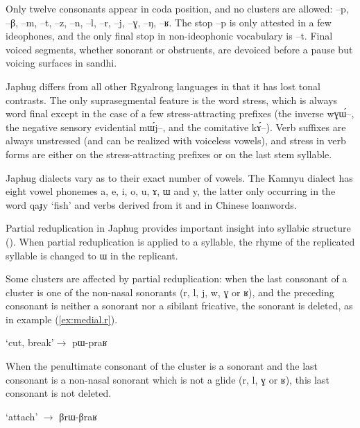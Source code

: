 \documentclass[oldfontcommands,oneside,a4paper,11pt]{article}
\newcommand{\ipa}[1]{{\phon#1}} %
\newcommand{\refb}[1]{(\ref{#1})}
\begin{document}
Only twelve   consonants appear in coda position, and no clusters are allowed:  \ipa{--p}, \ipa{--β}, \ipa{--m}, \ipa{--t}, \ipa{--z}, \ipa{--n}, \ipa{--l}, \ipa{--r}, \ipa{--j}, \ipa{--ɣ}, \ipa{--ŋ}, \ipa{--ʁ}. The stop \ipa{--p} is only attested in a few ideophones, and the only final stop in non-ideophonic vocabulary is \ipa{--t}. Final voiced segments, whether sonorant or obstruents, are devoiced before a pause but voicing surfaces in sandhi.

Japhug differs from all other Rgyalrong languages in that it has lost tonal contrasts. The only suprasegmental feature is the word stress, which is always word final except in the case of a few stress-attracting prefixes (the inverse \ipa{wɣɯ́--}, the negative sensory evidential \ipa{mɯ́j--}, and the comitative \ipa{kɤ́--}). Verb suffixes are always unstressed (and can be realized with voiceless vowels), and stress in verb forms are either on the stress-attracting prefixes or on the last stem syllable.

Japhug dialects vary as to their exact number of vowels. The Kamnyu dialect has eight vowel phonemes \ipa{a},  \ipa{e},  \ipa{i},  \ipa{o},  \ipa{u},   \ipa{ɤ},  \ipa{ɯ} and \ipa{y}, the latter only occurring in the word \ipa{qaɟy} `fish' and verbs derived from it and in Chinese loanwords. 

Partial reduplication in Japhug provides important insight into syllabic structure (\citealt{jacques07redupl}). When partial reduplication is applied to a syllable, the rhyme of the replicated syllable is changed to \ipa{ɯ} in the replicant.
 
Some clusters are affected by partial reduplication:   when the last consonant  of a cluster is one of the non-nasal sonorants (\ipa{r}, \ipa{l}, \ipa{j}, \ipa{w}, \ipa{ɣ} or \ipa{ʁ}), and the preceding consonant is neither a sonorant nor a sibilant fricative, the sonorant is deleted, as in example \refb{ex:medial.r}. 
 
 \begin{exe}
\ex \label{ex:medial.r}
\glt \ipa{praʁ} `cut, break'$\rightarrow$ \ipa{pɯ-praʁ}
\end{exe}

When the penultimate consonant of the cluster is a sonorant   and the last consonant is a non-nasal sonorant which is not a glide (\ipa{r}, \ipa{l}, \ipa{ɣ} or \ipa{ʁ}), this last consonant  is not deleted. 

 \begin{exe}
\ex  \label{ex:initial.r}
\glt \ipa{βraʁ} `attach' $\rightarrow$ \ipa{βrɯ-βraʁ}
\end{exe}
 
\end{document}
